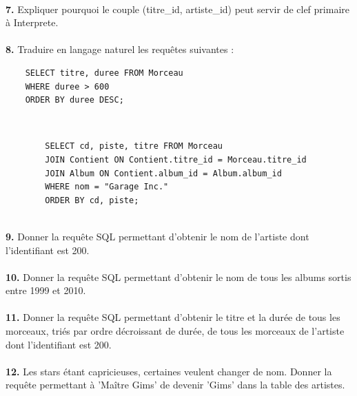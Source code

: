 \documentclass[article,a4paper,firamath,12pt]{nsi}
\begin{document}
\\

\textbf{7.} Expliquer pourquoi le couple (titre\_id, artiste\_id) peut servir de clef primaire à Interprete.\\

\\

\textbf{8.} Traduire en langage naturel les requêtes suivantes :	

\begin{sql}
    \begin{verbatim}
    SELECT titre, duree FROM Morceau 
    WHERE duree > 600 
    ORDER BY duree DESC;
    \end{verbatim}
\end{sql}

\\

\begin{sql}
    \begin{verbatim}
        SELECT cd, piste, titre FROM Morceau
        JOIN Contient ON Contient.titre_id = Morceau.titre_id
        JOIN Album ON Contient.album_id = Album.album_id 
        WHERE nom = "Garage Inc."
        ORDER BY cd, piste;                
    \end{verbatim}
\end{sql}

\\

\textbf{9.} Donner la requête SQL permettant d'obtenir le nom de l'artiste dont l'identifiant est 200.\\

\\


\textbf{10.}	Donner la requête SQL permettant d'obtenir le nom de tous les albums sortis entre 1999 et 2010.\\

\\
\newpage
\textbf{11.}	Donner la requête SQL permettant d'obtenir le titre et la durée de tous les morceaux, triés par ordre décroissant de durée, de tous les morceaux de l'artiste dont l'identifiant est 200.\\

\\

\textbf{12.}	Les stars étant capricieuses, certaines veulent changer de nom. Donner la requête permettant à 'Maître Gims' de devenir 'Gims' dans la table des artistes.\\
\end{document}
